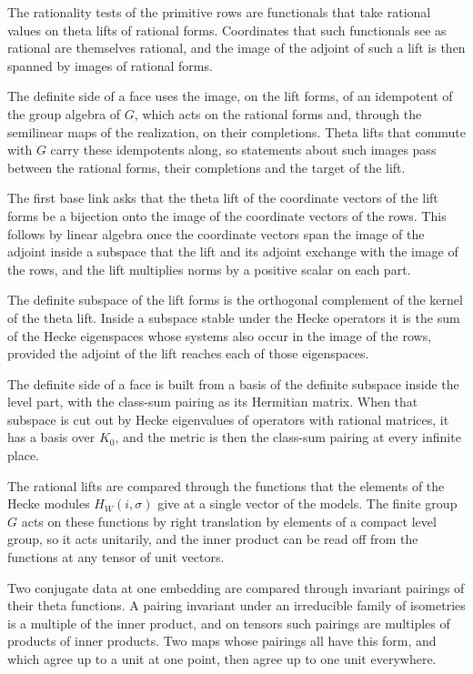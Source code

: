 The rationality tests of the primitive rows are functionals that take rational values on theta lifts
of rational forms. Coordinates that such functionals see as rational are themselves rational, and
the image of the adjoint of such a lift is then spanned by images of rational forms.

The definite side of a face uses the image, on the lift forms, of an idempotent of the group algebra
of $G$, which acts on the rational forms and, through the semilinear maps of the realization, on
their completions. Theta lifts that commute with $G$ carry these idempotents along, so statements
about such images pass between the rational forms, their completions and the target of the lift.

The first base link asks that the theta lift of the coordinate vectors of the lift forms be a
bijection onto the image of the coordinate vectors of the rows. This follows by linear algebra once
the coordinate vectors span the image of the adjoint inside a subspace that the lift and its adjoint
exchange with the image of the rows, and the lift multiplies norms by a positive scalar on each part.

The definite subspace of the lift forms is the orthogonal complement of the kernel of the theta lift.
Inside a subspace stable under the Hecke operators it is the sum of the Hecke eigenspaces whose
systems also occur in the image of the rows, provided the adjoint of the lift reaches each of those
eigenspaces.

The definite side of a face is built from a basis of the definite subspace inside the level part,
with the class-sum pairing as its Hermitian matrix. When that subspace is cut out by Hecke
eigenvalues of operators with rational matrices, it has a basis over $K_0$, and the metric is then
the class-sum pairing at every infinite place.

The rational lifts are compared through the functions that the elements of the Hecke modules
$H_W(i,\sigma)$ give at a single vector of the models. The finite group $G$ acts on these functions by
right translation by elements of a compact level group, so it acts unitarily, and the inner product
can be read off from the functions at any tensor of unit vectors.

Two conjugate data at one embedding are compared through invariant pairings of their theta functions.
A pairing invariant under an irreducible family of isometries is a multiple of the inner product, and
on tensors such pairings are multiples of products of inner products. Two maps whose pairings all have
this form, and which agree up to a unit at one point, then agree up to one unit everywhere.

